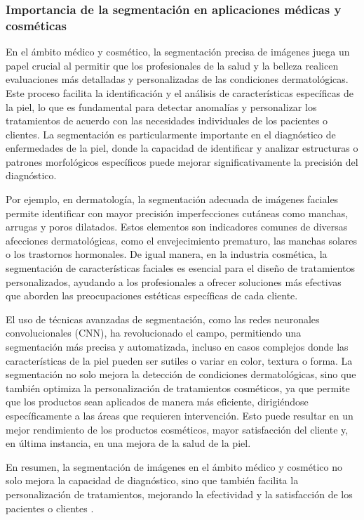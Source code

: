 \subsubsection{Importancia de la segmentación en aplicaciones médicas y cosméticas}
En el ámbito médico y cosmético, la segmentación precisa de imágenes juega un papel crucial al permitir que los profesionales de la salud y la belleza realicen evaluaciones más detalladas y personalizadas de las condiciones dermatológicas. Este proceso facilita la identificación y el análisis de características específicas de la piel, lo que es fundamental para detectar anomalías y personalizar los tratamientos de acuerdo con las necesidades individuales de los pacientes o clientes. La segmentación es particularmente importante en el diagnóstico de enfermedades de la piel, donde la capacidad de identificar y analizar estructuras o patrones morfológicos específicos puede mejorar significativamente la precisión del diagnóstico.

Por ejemplo, en dermatología, la segmentación adecuada de imágenes faciales permite identificar con mayor precisión imperfecciones cutáneas como manchas, arrugas y poros dilatados. Estos elementos son indicadores comunes de diversas afecciones dermatológicas, como el envejecimiento prematuro, las manchas solares o los trastornos hormonales. De igual manera, en la industria cosmética, la segmentación de características faciales es esencial para el diseño de tratamientos personalizados, ayudando a los profesionales a ofrecer soluciones más efectivas que aborden las preocupaciones estéticas específicas de cada cliente.

El uso de técnicas avanzadas de segmentación, como las redes neuronales convolucionales (CNN), ha revolucionado el campo, permitiendo una segmentación más precisa y automatizada, incluso en casos complejos donde las características de la piel pueden ser sutiles o variar en color, textura o forma. La segmentación no solo mejora la detección de condiciones dermatológicas, sino que también optimiza la personalización de tratamientos cosméticos, ya que permite que los productos sean aplicados de manera más eficiente, dirigiéndose específicamente a las áreas que requieren intervención. Esto puede resultar en un mejor rendimiento de los productos cosméticos, mayor satisfacción del cliente y, en última instancia, en una mejora de la salud de la piel.

En resumen, la segmentación de imágenes en el ámbito médico y cosmético no solo mejora la capacidad de diagnóstico, sino que también facilita la personalización de tratamientos, mejorando la efectividad y la satisfacción de los pacientes o clientes \cite{mohammadi2019}.

